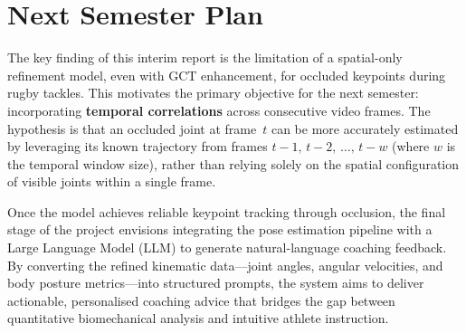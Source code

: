 \documentclass{article}
\begin{document}
\section{Next Semester Plan}
\label{sec:next}

The key finding of this interim report is the limitation of a
spatial-only refinement model, even with GCT enhancement, for occluded
keypoints during rugby tackles.
This motivates the primary objective for the next semester:
incorporating \textbf{temporal correlations} across consecutive video
frames.
The hypothesis is that an occluded joint at frame~$t$ can be more
accurately estimated by leveraging its known trajectory from frames
$t\!-\!1,\, t\!-\!2,\, \ldots,\, t\!-\!w$ (where $w$ is the temporal
window size), rather than relying solely on the spatial configuration of
visible joints within a single frame.

Once the model achieves reliable keypoint tracking through occlusion,
the final stage of the project envisions integrating the pose estimation
pipeline with a Large Language Model (LLM) to generate natural-language
coaching feedback.
By converting the refined kinematic data---joint angles, angular
velocities, and body posture metrics---into structured prompts, the
system aims to deliver actionable, personalised coaching advice that
bridges the gap between quantitative biomechanical analysis and
intuitive athlete instruction.




\end{document}
